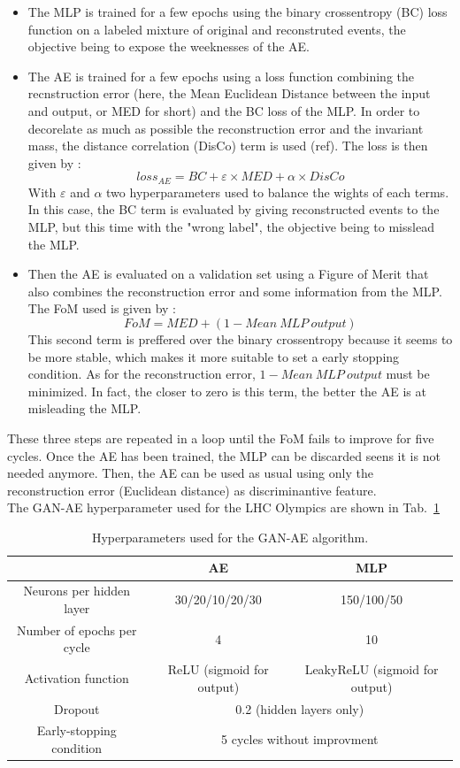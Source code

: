 \documentclass[letterpaper,11pt]{article}
\begin{document}
\begin{itemize}
	\item The MLP is trained for a few epochs using the binary crossentropy (BC) loss function on a labeled mixture of original and reconstruted events, the objective being to expose the weeknesses of the AE.
	
	\item The AE is trained for a few epochs using a loss function combining the recnstruction error (here, the Mean Euclidean Distance between the input and output, or MED for short) and the BC loss of the MLP.
	In order to decorelate as much as possible the reconstruction error and the invariant mass, the distance correlation (DisCo) term is used (ref).
	The loss is then given by :
	$$loss_{AE} = BC+\varepsilon\times MED+\alpha\times DisCo$$
	\noindent With $\varepsilon$ and $\alpha$ two hyperparameters used to balance the wights of each terms. In this case, the BC term is evaluated by giving reconstructed events to the MLP, but this time with the "wrong label", the objective being to misslead the MLP. 
	
	\item Then the AE is evaluated on a validation set using a Figure of Merit that also combines the reconstruction error and some information from the MLP.
	The FoM used is given by :
	$$FoM = MED+(1-Mean~MLP~output)$$
	\noindent This second term is preffered over the binary crossentropy because it seems to be more stable, which makes it more suitable to set a early stopping condition.
	As for the reconstruction error, $1-Mean~MLP~output$ must be minimized.
	In fact, the closer to zero is this term, the better the AE is at misleading the MLP.
\end{itemize}

\noindent These three steps are repeated in a loop until the FoM fails to improve for five cycles. Once the AE has been trained, the MLP can be discarded seens it is not needed anymore. Then, the AE can be used as usual using only the reconstruction error (Euclidean distance) as discriminantive feature.\\

\noindent The GAN-AE hyperparameter used for the LHC Olympics are shown in Tab.~\ref{tab:param_GAE}
\begin{table}[h!]
	\centering
	\begin{tabular}{|c|c|c|}
		\hline
		 & AE & MLP \\
		\hline
		Neurons per hidden layer & 30/20/10/20/30 &  150/100/50 \\
		\hline
		Number of epochs per cycle & 4 & 10 \\
		\hline
		Activation function & ReLU (sigmoid for output) & LeakyReLU (sigmoid for output) \\
		\hline
		Dropout & \multicolumn{2}{|c|}{ 0.2 (hidden layers only)} \\
		\hline
		Early-stopping condition & \multicolumn{2}{|c|}{5 cycles without improvment} \\
		\hline
	\end{tabular}
	\caption{Hyperparameters used for the GAN-AE algorithm.}
	\label{tab:param_GAE}
\end{table}
\end{document}
